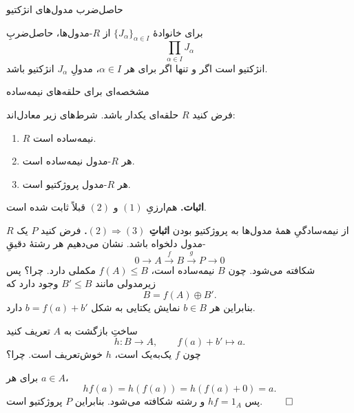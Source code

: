 \begin{frame}[t]{حاصل‌ضرب مدول‌های انژکتیو}
  \label{lec18:product-injectives}
  \begin{remark}
    برای خانوادهٔ $\{J_\alpha\}_{\alpha\in I}$ از $R$-مدول‌ها، حاصل‌ضربِ
    \[
      \prod_{\alpha\in I}J_\alpha
    \]
    انژکتیو است اگر و تنها اگر برای هر $\alpha\in I$، مدولِ $J_\alpha$ انژکتیو باشد.
  \end{remark}
\end{frame}

\begin{frame}[t]{مشخصه‌ای برای حلقه‌های نیمه‌ساده}
  \label{lec18:semisimple-equivalences}
  \begin{theorem}
    فرض کنید $R$ حلقه‌ای یکدار باشد. شرط‌های زیر معادل‌اند:
    \begin{enumerate}
      \item $R$ نیمه‌ساده است.
      \item هر $R$-مدول نیمه‌ساده است.
      \item هر $R$-مدول پروژکتیو است.
    \end{enumerate}
  \end{theorem}
  \textbf{اثبات.} هم‌ارزیِ $(1)$ و $(2)$ قبلاً ثابت شده است.
\end{frame}

\begin{frame}[t]{از نیمه‌سادگیِ همهٔ مدول‌ها به پروژکتیو بودن}
  \label{lec18:semisimple-projective-complement}
  \textbf{اثباتِ $(2)\Rightarrow(3)$.}
  فرض کنید $P$ یک $R$-مدول دلخواه باشد. نشان می‌دهیم هر رشتهٔ دقیقِ
  \[
    0\longrightarrow A\xrightarrow{\ f\ }B
      \xrightarrow{\ g\ }P\longrightarrow0
  \]
  شکافته می‌شود.
  چون $B$ نیمه‌ساده است، $f(A)\leqslant B$ مکملی دارد. \alert{چرا؟}
  پس زیرمدولی مانند $B'\leqslant B$ وجود دارد که
  \[
    B=f(A)\oplus B'.
  \]
  بنابراین هر $b\in B$ نمایش یکتایی به شکل $b=f(a)+b'$ دارد.
\end{frame}

\begin{frame}[t]{ساختِ بازگشت به $A$}
  \label{lec18:semisimple-projective-retraction}
  تعریف کنید
  \[
    h:B\longrightarrow A,\qquad f(a)+b'\longmapsto a.
  \]
  چون $f$ یک‌به‌یک است، $h$ خوش‌تعریف است. \alert{چرا؟}
  \medskip

  برای هر $a\in A$،
  \[
    hf(a)=h(f(a))=h(f(a)+0)=a.
  \]
  پس $hf=1_A$ و رشته شکافته می‌شود. بنابراین $P$ پروژکتیو است.
  \hfill$\qed$
\end{frame}

